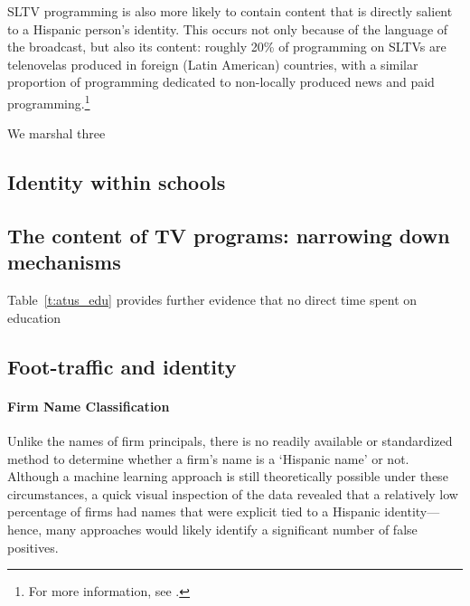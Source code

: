 \documentclass[11pt]{article}
\begin{document}
SLTV programming is also more likely to contain content that is directly salient to a Hispanic person's identity. This occurs not only because of the language of the broadcast, but also its content: roughly 20\% of programming on SLTVs are telenovelas produced in foreign (Latin American) countries, with a similar proportion of programming dedicated to non-locally produced news and paid programming.\footnote{For more information, see \cite{noauthor_hispanic_2016}. }


We marshal three

\subsection{Identity within schools}

\subsection{The content of TV programs: narrowing down mechanisms}


Table~\ref{t:atus_edu} provides further evidence that no direct time spent on education


\subsection{Foot-traffic and identity}\label{s:safegraph}



\paragraph{Firm Name Classification} Unlike the names of firm principals, there is no readily available or standardized method to determine whether a firm's name is a `Hispanic name' or not. Although a machine learning approach is still theoretically possible under these circumstances, a quick visual inspection of the data revealed that a relatively low percentage of firms had names that were explicit tied to a Hispanic identity---hence, many approaches would likely identify a significant number of false positives.
\end{document}
